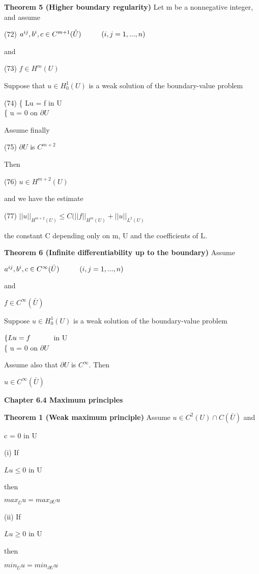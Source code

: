 \documentclass{article}
\newcommand\tab[1][1cm]{\hspace*{#1}}
\begin{document}
\textbf {Theorem 5 (Higher boundary regularity)} Let m be a nonnegative integer, and assume 
\begin{center}
(72) \tab $a^{ij}, b^i, c \in C^{m+1}(\hat{U}) \tab (i, j = 1,...,n)$
\end{center}
and 
\begin{center}
(73) \tab $f \in H^m(U)$
\end{center}
Suppose that $u \in H_0^1(U)$ is a weak solution of the boundary-value problem
\begin{center}
(74) \tab \{ Lu = f \tab in U \\
\tab \{ u = 0 \tab on $\partial U$
\end{center}
Assume finally
\begin{center}
(75) \tab $\partial U$ is $C^{m+2}$
\end{center}
Then 
\begin{center}
(76) \tab $u \in H^{m+2}(U)$
\end{center}
and we have the estimate
\begin{center}
(77) \tab $||u||_{H^{m+2}(U)} \leq C(||f||_{H^{m}(U)} + ||u||_{L^{2}(U)}$
\end{center}
the constant C depending only on m, U and the coefficients of L.

\textbf {Theorem 6 (Infinite differentiability up to the boundary)} Assume 
\begin{center}
$a^{ij}, b^i, c \in C^{\infty}(\bar{U}) \tab (i, j = 1,...,n)$
\end{center}
and 
\begin{center}
$f \in C^{\infty}(\bar{U})$
\end{center}
Suppose $u \in H_0^1(U)$ is a weak solution of the boundary-value problem
\begin{center}
$\{Lu = f \tab$ in U \\
\{ u = 0 \tab on $\partial U$
\end{center}
Assume also that $\partial U$ is $C^{\infty}$. Then
\begin{center}
$ u \in C^{\infty}(\bar{U})$
\end{center}

\textbf {Chapter 6.4 Maximum principles}

\textbf {Theorem 1 (Weak maximum principle)} Assume $u \in C^{2}(U) \cap C(\bar{U})$ and 
\begin{center}
c = 0 \tab in U
\end{center}
\tab (i) If 
\begin{center}
$Lu \leq 0$ \tab in U
\end{center}
then 
\begin{center}
$max_{\bar{U}}u = max_{\partial U} u$
\end{center}
\tab (ii) If 
\begin{center}
$Lu \geq 0$ \tab in U
\end{center}
then
\begin{center}
$min_{\bar{U}} u = min_{\partial U} u$
\end{center}
\end{document}
